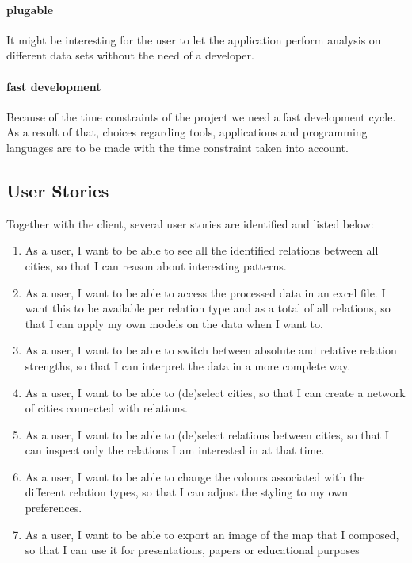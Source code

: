 \paragraph{plugable} It might be interesting for the user to let the application perform analysis on different data sets without the need of a developer. 
\paragraph{fast development} Because of the time constraints of the project we need a fast development cycle. As a result of that, choices regarding tools, applications and programming languages are to be made with the time constraint taken into account.

\subsection{User Stories}
Together with the client, several user stories are identified and listed below:
\begin{enumerate}
    \item As a user, I want to be able to see all the identified relations between all cities, so that I can reason about interesting patterns.
    \item As a user, I want to be able to access the processed data in an excel file. I want this to be available per relation type and as a total of all relations, so that I can apply my own models on the data when I want to.
    \item As a user, I want to be able to switch between absolute and relative relation strengths, so that I can interpret the data in a more complete way.
    \item As a user, I want to be able to (de)select cities, so that I can create a network of cities connected with relations.
    \item As a user, I want to be able to (de)select relations between cities, so that I can inspect only the relations I am interested in at that time.
    \item As a user, I want to be able to change the colours associated with the different relation types, so that I can adjust the styling to my own preferences.
    \item As a user, I want to be able to export an image of the map that I composed, so that I can use it for presentations, papers or educational purposes
\end{enumerate}



